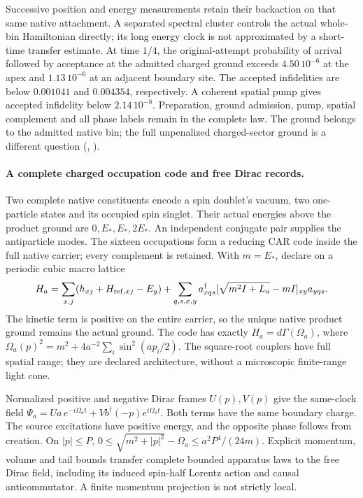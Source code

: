 Successive position and energy measurements retain their backaction on
that same native attachment. A separated spectral cluster controls the
actual whole-bin Hamiltonian directly; its long energy clock is not
approximated by a short-time transfer estimate. At time $1/4$, the
original-attempt probability of arrival followed by acceptance at the
admitted charged ground exceeds $4.50\,10^{-6}$ at the apex and
$1.13\,10^{-6}$ at an adjacent boundary site. The accepted infidelities
are below $0.001041$ and $0.004354$, respectively. A coherent spatial
pump gives accepted infidelity below $2.14\,10^{-8}$. Preparation,
ground admission, pump, spatial complement and all phase labels remain
in the complete law. The ground belongs to the admitted native bin;
the full unpenalized charged-sector ground is a different question
(, \cite{ophrepo}).

\paragraph{A complete charged occupation code and free Dirac records.}
Two complete native constituents encode a spin doublet's vacuum, two
one-particle states and its occupied spin singlet. Their actual energies
above the product ground are $0,E_*,E_*,2E_*$. An independent conjugate
pair supplies the antiparticle modes. The sixteen occupations form a
reducing CAR code inside the full native carrier; every complement is
retained. With $m=E_*$, declare on a periodic cubic macro lattice
\[
 H_a=\sum_{x,j}(h_{xj}+H_{{\rm ref},xj}-E_g)
       +\sum_{q,s,x,y}a^\dagger_{xqs}
       [\sqrt{m^2I+L_a}-mI]_{xy}a_{yqs}.
\]
The kinetic term is positive on the entire carrier, so the unique native
product ground remains the actual ground. The code has exactly
$H_a=d\Gamma(\Omega_a)$, where
$\Omega_a(p)^2=m^2+4a^{-2}\sum_i\sin^2(ap_i/2)$.
The square-root couplers have full spatial range; they are declared
architecture, without a microscopic finite-range light cone.

Normalized positive and negative Dirac frames $U(p),V(p)$ give the
same-clock field
$\Psi_a=Ua\,e^{-i\Omega_at}+Vb^\dagger(-p)e^{i\Omega_at}$.
Both terms have the same boundary charge. The source excitations have
positive energy, and the opposite phase follows from creation.
On $|p|\le P$, $0\le\sqrt{m^2+|p|^2}-\Omega_a\le a^2P^4/(24m)$.
Explicit momentum, volume and tail bounds transfer complete bounded
apparatus laws to the free Dirac field, including its induced spin-half
Lorentz action and causal anticommutator. A finite momentum projection
is not strictly local.


